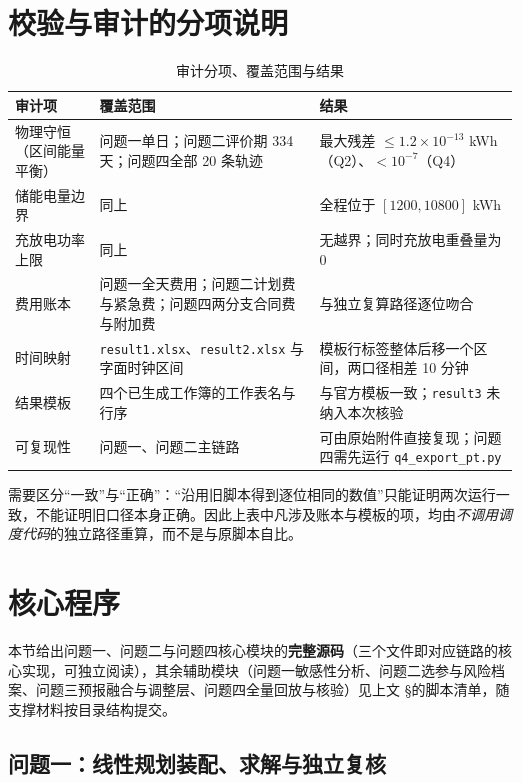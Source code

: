 \section{校验与审计的分项说明}
\label{app:audit}

\begin{table}[H]
  \centering
  \caption{审计分项、覆盖范围与结果}
  \label{tab:app-audit}
  \footnotesize
  \setlength{\tabcolsep}{4pt}
  \begin{tabularx}{\textwidth}{l>{\raggedright\arraybackslash}Xl}
    \toprule
    审计项 & 覆盖范围 & 结果 \\
    \midrule
    物理守恒（区间能量平衡） & 问题一单日；问题二评价期 334 天；问题四全部 20 条轨迹 & 最大残差 $\le1.2\times10^{-13}$ kWh（Q2）、$<10^{-7}$（Q4） \\
    储能电量边界 & 同上 & 全程位于 $[1200,10800]$ kWh \\
    充放电功率上限 & 同上 & 无越界；同时充放电重叠量为 0 \\
    费用账本 & 问题一全天费用；问题二计划费与紧急费；问题四两分支合同费与附加费 & 与独立复算路径逐位吻合 \\
    时间映射 & \texttt{result1.xlsx}、\texttt{result2.xlsx} 与字面时钟区间 & 模板行标签整体后移一个区间，两口径相差 10 分钟 \\
    结果模板 & 四个已生成工作簿的工作表名与行序 & 与官方模板一致；\texttt{result3} 未纳入本次核验 \\
    可复现性 & 问题一、问题二主链路 & 可由原始附件直接复现；问题四需先运行 \texttt{q4\_export\_pt.py} \\
    \bottomrule
  \end{tabularx}
\end{table}

需要区分``一致''与``正确''：``沿用旧脚本得到逐位相同的数值''只能证明两次运行一致，不能证明旧口径本身正确。因此上表中凡涉及账本与模板的项，均由\emph{不调用调度代码}的独立路径重算，而不是与原脚本自比。

\section{核心程序}

本节给出问题一、问题二与问题四核心模块的\textbf{完整源码}（三个文件即对应链路的核心实现，可独立阅读），其余辅助模块（问题一敏感性分析、问题二选参与风险档案、问题三预报融合与调整层、问题四全量回放与核验）见上文 \S 的脚本清单，随支撑材料按目录结构提交。

\subsection{问题一：线性规划装配、求解与独立复核}
\label{app:q1-code}


